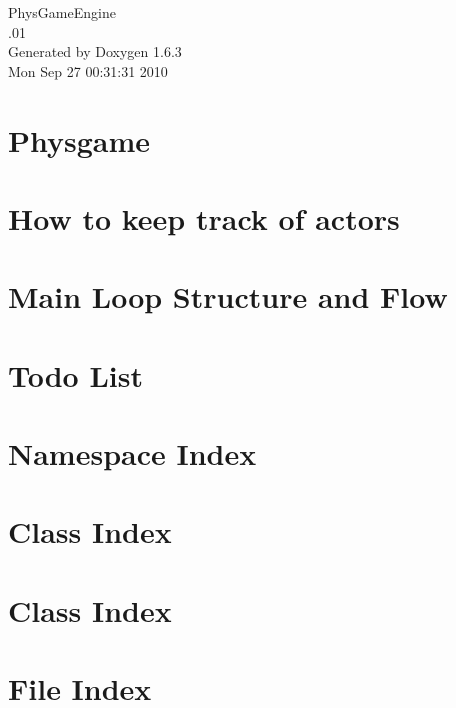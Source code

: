 \documentclass[a4paper]{book}
\begin{document}
\hypersetup{pageanchor=false}
\begin{titlepage}
\vspace*{7cm}
\begin{center}
{\Large PhysGameEngine \\[1ex]\large .01 }\\
\vspace*{1cm}
{\large Generated by Doxygen 1.6.3}\\
\vspace*{0.5cm}
{\small Mon Sep 27 00:31:31 2010}\\
\end{center}
\end{titlepage}
\clearemptydoublepage
{}
\tableofcontents
\clearemptydoublepage
{}
\hypersetup{pageanchor=true}
\chapter{Physgame}
\label{index}\hypertarget{index}{}
\chapter{How to keep track of actors}
\label{actorcontainer1}
\hypertarget{actorcontainer1}{}

\chapter{Main Loop Structure and Flow}
\label{mainloop1}
\hypertarget{mainloop1}{}

\chapter{Todo List}
\label{todo}
\hypertarget{todo}{}

\chapter{Namespace Index}

\chapter{Class Index}

\chapter{Class Index}

\chapter{File Index}

\end{document}
